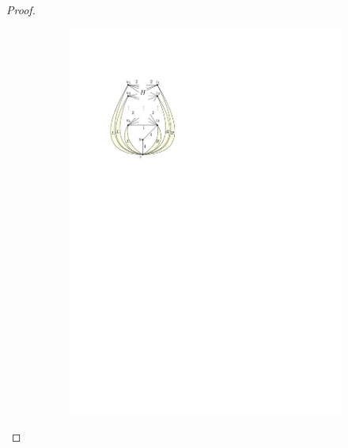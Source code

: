 \documentclass[runningheads]{llncs}
\begin{document}
\begin{proof}
\begin{figure}[htpb]
\begin{subfigure}[b]{0.40\textwidth}
         \includegraphics[scale=0.90]{img/act-hamilton-cycle-a}
         \label{fig:act-hamilton-cycle-a}
     \end{subfigure}
     \hfill
     \begin{subfigure}[b]{0.32\textwidth}
         \centering

\end{subfigure}
\end{figure}
\end{proof}
\end{document}
